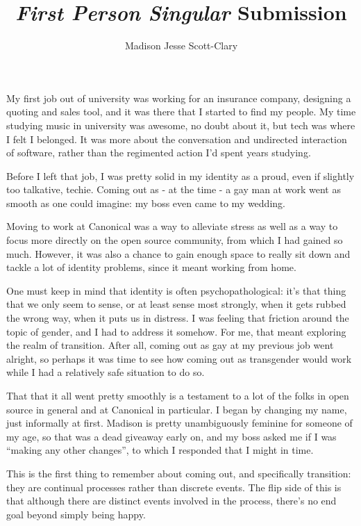 \documentclass[12pt,letterpaper,oneside]{memoir}
\title{\textit{First Person Singular} Submission}
\author{Madison Jesse Scott-Clary}
\date{}
\begin{document}
  \maketitle

My first job out of university was working for an insurance company, designing a quoting and sales tool, and it was there that I started to find my people.  My time studying music in university was awesome, no doubt about it, but tech was where I felt I belonged.  It was more about the conversation and undirected interaction of software, rather than the regimented action I'd spent years studying.

Before I left that job, I was pretty solid in my identity as a proud, even if slightly too talkative, techie.  Coming out as - at the time - a gay man at work went as smooth as one could imagine: my boss even came to my wedding.

Moving to work at Canonical was a way to alleviate stress as well as a way to focus more directly on the open source community, from which I had gained so much.  However, it was also a chance to gain enough space to really sit down and tackle a lot of identity problems, since it meant working from home.

One must keep in mind that identity is often psychopathological: it's that thing that we only seem to sense, or at least sense most strongly, when it gets rubbed the wrong way, when it puts us in distress.  I was feeling that friction around the topic of gender, and I had to address it somehow.  For me, that meant exploring the realm of transition.  After all, coming out as gay at my previous job went alright, so perhaps it was time to see how coming out as transgender would work while I had a relatively safe situation to do so.

That that it all went pretty smoothly is a testament to a lot of the folks in open source in general and at Canonical in particular.  I began by changing my name, just informally at first.  Madison is pretty unambiguously feminine for someone of my age, so that was a dead giveaway early on, and my boss asked me if I was ``making any other changes'', to which I responded that I might in time.

This is the first thing to remember about coming out, and specifically transition: they are continual processes rather than discrete events.  The flip side of this is that although there are distinct events involved in the process, there's no end goal beyond simply being happy.
\end{document}

